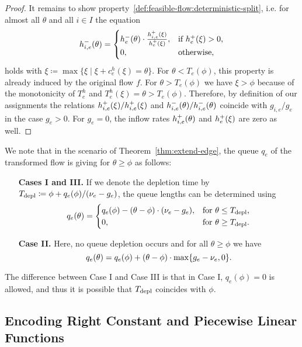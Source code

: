 \begin{proof}
    It remains to show property~\ref{def:feasible-flow:deterministic-split}, i.e. for almost all $\theta$ and all $i\in I$ the equation
    \[
        \outfl[h]_{i,e}(\theta) = \begin{cases}
            \outfl[h]_e(\theta) \cdot \frac{\infl[h]_{i,e}(\xi)}{\infl[h]_e(\xi)}, & \text{if $\infl[h]_e(\xi) > 0$,}\\
            0, & \text{otherwise,}
        \end{cases}
    \]
    holds with $\xi\coloneqq \max \{ \xi  \mid \xi + c^h_e(\xi) = \theta \}$.
    For $\theta < T_e(\phi)$, this property is already induced by the original flow $f$.
    For $\theta > T_e(\phi)$ we have $\xi > \phi$ because of the monotonicity of $T^h_e$ and $T^h_e(\xi) = \theta > T_e(\phi)$.
    Therefore, by definition of our assignments the relations $\infl[h]_{i,e}(\xi) / \infl[h]_{i,e}(\xi)$ and $\outfl[h]_{i,e}(\theta) / \outfl[h]_{i,e}(\theta)$ coincide with $g_{i,e}/g_e$ in the case $g_e > 0$.
    For $g_e = 0$, the inflow rates $\infl[h]_{i,e}(\theta)$ and $\infl[h]_{e}(\xi)$ are zero as well.
\end{proof}

We note that in the scenario of Theorem~\ref{thm:extend-edge}, the queue $q_e$ of the transformed flow is giving for $\theta \geq \phi$ as follows:
\begin{enumerate}[wide=0.5em]
    \item[\textbf{Cases I and III.}] If we denote the depletion time by $T_{\depl} \coloneqq \phi + q_e(\phi) / (\capa_e - g_e)$, the queue lengths can be determined using \[
        q_e(\theta) = \begin{cases}
            q_e(\phi) - (\theta - \phi)\cdot (\capa_e - g_e), & \text{for $\theta \leq T_{\depl}$,}\\
            0, & \text{for $\theta \geq T_{\depl}$.}
        \end{cases}
    \]
    \item[\textbf{Case II.}] Here, no queue depletion occurs and for all $\theta \geq \phi$ we have \[
        q_e(\theta) = q_e(\phi) + (\theta - \phi)\cdot \max\{g_e - \capa_e, 0\}.
    \]
\end{enumerate}

The difference between Case I and Case III is that in Case I, $q_e(\phi) = 0$ is allowed, and thus it is possible that $T_{\depl}$ coincides with $\phi$.


\subsection{Encoding Right Constant and Piecewise Linear Functions}

